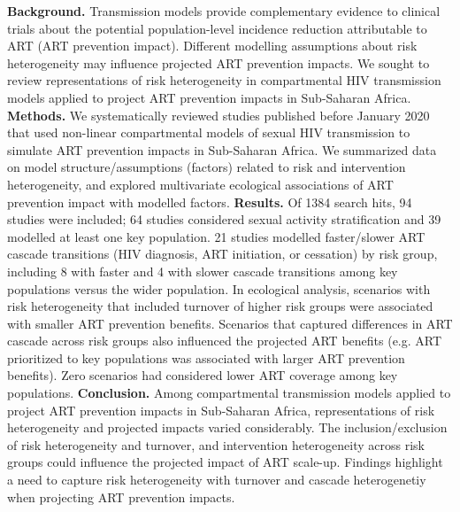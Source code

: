 \textbf{Background.}
Transmission models provide complementary evidence to clinical trials about
the potential population-level incidence reduction attributable to ART (ART prevention impact).
Different modelling assumptions about risk heterogeneity may influence projected ART prevention impacts.
We sought to review representations of risk heterogeneity in compartmental HIV transmission models
applied to project ART prevention impacts in Sub-Saharan Africa.
\textbf{Methods.}
We systematically reviewed studies published before January 2020 that used
non-linear compartmental models of sexual HIV transmission
to simulate ART prevention impacts in Sub-Saharan Africa.
We summarized data on model structure/assumptions (factors) related to risk and intervention heterogeneity,
and explored multivariate ecological associations of ART prevention impact with modelled factors.
\textbf{Results.}
Of 1384 search hits, 94 studies were included;
64 studies considered sexual activity stratification and 39 modelled at least one key population.
21 studies modelled faster/slower ART cascade transitions (HIV diagnosis, ART initiation, or cessation) by risk group,
including 8 with faster and 4 with slower cascade transitions among key populations versus the wider population.
In ecological analysis, scenarios with risk heterogeneity that included turnover of higher risk groups
were associated with smaller ART prevention benefits. Scenarios that captured differences in ART cascade across risk groups also influenced the projected ART benefits (e.g. 
ART prioritized to key populations was associated with larger ART prevention benefits). %
Zero scenarios had considered lower ART coverage among key populations. %
\textbf{Conclusion.}
Among compartmental transmission models applied to project ART prevention impacts in Sub-Saharan Africa,
representations of risk heterogeneity and projected impacts varied considerably. The inclusion/exclusion of risk heterogeneity and turnover, and intervention heterogeneity across risk groups could influence the projected impact of ART scale-up. %
Findings highlight a need to capture risk heterogeneity with turnover and 
cascade heterogenetiy when projecting ART prevention impacts.